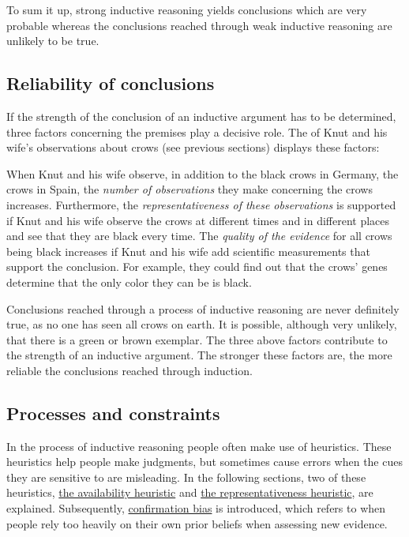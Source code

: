 \documentclass[
]{krantz}
\begin{document}
To sum it up, strong inductive reasoning yields conclusions which are very probable whereas the conclusions reached through weak inductive reasoning are unlikely to be true.

\hypertarget{reliability-of-conclusions}{%
\subsection*{Reliability of conclusions}\label{reliability-of-conclusions}}


If the strength of the conclusion of an inductive argument has to be determined, three factors concerning the premises play a decisive role. The of Knut and his wife's observations about crows (see previous sections) displays these factors:

When Knut and his wife observe, in addition to the black crows in Germany, the crows in Spain, the \emph{number of observations} they make concerning the crows increases. Furthermore, the \emph{representativeness of these observations} is supported if Knut and his wife observe the crows at different times and in different places and see that they are black every time. The \emph{quality of the evidence} for all crows being black increases if Knut and his wife add scientific measurements that support the conclusion. For example, they could find out that the crows' genes determine that the only color they can be is black.

Conclusions reached through a process of inductive reasoning are never definitely true, as no one has seen all crows on earth. It is possible, although very unlikely, that there is a green or brown exemplar. The three above factors contribute to the strength of an inductive argument. The stronger these factors are, the more reliable the conclusions reached through induction.

\hypertarget{processes-and-constraints}{%
\subsection*{Processes and constraints}\label{processes-and-constraints}}


In the process of inductive reasoning people often make use of heuristics. These heuristics help people make judgments, but sometimes cause errors when the cues they are sensitive to are misleading. In the following sections, two of these heuristics, \protect\hyperlink{the-availability-heuristic}{the availability heuristic} and \protect\hyperlink{the-representativeness-heuristic}{the representativeness heuristic}, are explained. Subsequently, \protect\hyperlink{confirmation-bias-1}{confirmation bias} is introduced, which refers to when people rely too heavily on their own prior beliefs when assessing new evidence.
\end{document}
